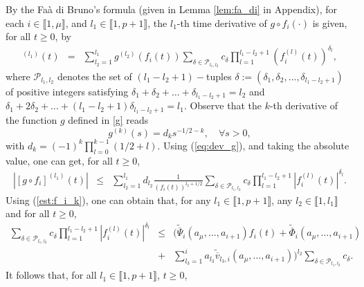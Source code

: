 \documentclass[letterpaper, 10pt]{article}
\newcommand{\rref}[1]{(\ref{#1})}
\newcommand{\abs}[1]{\left| #1 \right|}
\newcommand{\pcal}{\mathcal{P}}
\begin{document}
By the Fa\`a di Bruno's formula (given in Lemma \ref{lem:fa_di} in Appendix), for each $i \in \llbracket 1 , \mu \rrbracket$, and $l_1 \in \llbracket 1, p+1 \rrbracket$, the $l_1$-th time derivative of $g \circ f_i( \cdot)$ is given, for all $t \geq 0$, by
\begin{eqnarray*}
[g \circ f_i]^{(l_1)}(t) & = & \sum\limits_{l_2=1}^{l_1 } g^{(l_2)}(f_i(t) ) \sum\limits_{\delta \in \pcal_{l_1 ,l_2}} c_\delta \prod\limits_{l=1}^{l_1-l_2+1}(f_i^{(l)}(t))^{\delta_l}, 
\end{eqnarray*} 
where $\pcal_{l_1,l_2}$ denotes the set of $(l_1 - l_2 +1)-$tuples $\delta :=(\delta_1 , \delta_2, \ldots , \delta_{l_1 - l_2 +1})$  of positive integers satisfying $\delta_1 + \delta_2 + \ldots +\delta_{l_1 - l_2+1} = l_2$ and $\delta_1 +2 \delta_2 + \ldots + (l_1 - l_2+1) \delta_{l_1 - l_2+1} =l_1$.
Observe that the $k$-th derivative of the function $g$ defined in \eqref{g} reads
\begin{equation}
\label{eq:dev_g}
g^{(k)}(s) = d_k s^{-1/2 - k}, \quad \forall s>0,
\end{equation}
with $d_k = (-1)^k\prod\limits_{l=0}^{k-1} (1/2 + l )$. Using \rref{eq:dev_g}, and taking the absolute value, one can get, for all $t \geq 0$,
\begin{eqnarray*}
\abs{[g \circ f_i]^{(l_1)}(t)} & \leq & \sum\limits_{l_2=1}^{l_1 } d_{l_2} \frac{1 }{( f_i(t) )^{l_2 + 1/2 }} \sum\limits_{\delta \in \pcal_{l_1 ,l_2}} c_\delta \prod\limits_{l=1}^{l_1-l_2+1}\abs{f_i^{(l)}(t)}^{\delta_l} .
\end{eqnarray*}
Using \rref{est:f_i_k}, one can obtain that, for any $l_1 \in \llbracket 1 , p+1 \rrbracket$, any $l_2 \in \llbracket 1 , l_1 \rrbracket $ and for all $t \geq 0$, 
\begin{eqnarray*}
\sum\limits_{\delta \in \pcal_{l_1 ,l_2}} c_\delta \prod\limits_{l=1}^{l_1-l_2+1}\abs{f_i^{(l)}(t)}^{\delta_l} & \leq & \bigg(  \tilde{\overline{\Psi}}_{i}(a_\mu , \ldots , a_{i +1}) f_{i}(t)+ \tilde{\overline{\Phi}}_{i}(a_\mu , \ldots , a_{i +1})  \\& + &   \sum\limits_{l_3  =1}^{i}  a_{l_3} \tilde{\overline{v}}_{l_3,i} (a_\mu , \ldots , a_{i +1})    \bigg)^{l_2} \sum\limits_{\delta \in \pcal_{l_1 ,l_2}} c_\delta  .
\end{eqnarray*}
It follows that, for all $l_1 \in \llbracket 1 , p+1 \rrbracket$,  $t \geq 0$,
\end{document}
